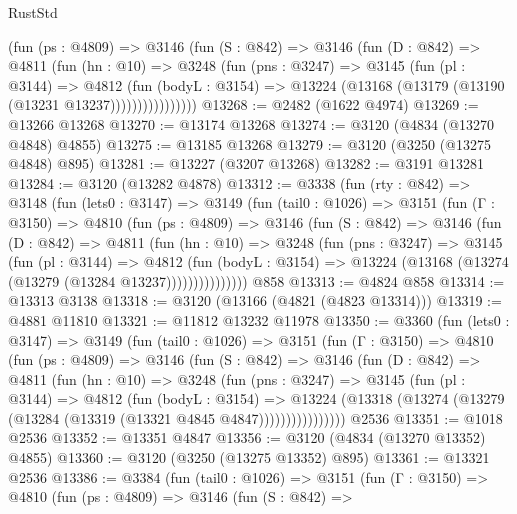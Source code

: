 \begin{lexlean}{RustStd}
\begin{coremodule}
              (fun (ps : @4809) =>
              @3146
                (fun (S : @842) =>
                @3146
                  (fun (D : @842) =>
                  @4811
                    (fun (hn : @10) =>
                    @3248
                      (fun (pns : @3247) =>
                      @3145
                        (fun (pl : @3144) =>
                        @4812
                          (fun (bodyL : @3154) =>
                          @13224 (@13168 (@13179 (@13190 (@13231 @13237))))))))))))))))
@13268 := @2482 (@1622 @4974)
@13269 := @13266 @13268
@13270 := @13174 @13268
@13274 := @3120 (@4834 (@13270 @4848) @4855)
@13275 := @13185 @13268
@13279 := @3120 (@3250 (@13275 @4848) @895)
@13281 := @13227 (@3207 @13268)
@13282 := @3191 @13281
@13284 := @3120 (@13282 @4878)
@13312 := @3338
    (fun (rty : @842) =>
    @3148
      (fun (lets0 : @3147) =>
      @3149
        (fun (tail0 : @1026) =>
        @3151
          (fun (Γ : @3150) =>
          @4810
            (fun (ps : @4809) =>
            @3146
              (fun (S : @842) =>
              @3146
                (fun (D : @842) =>
                @4811
                  (fun (hn : @10) =>
                  @3248
                    (fun (pns : @3247) =>
                    @3145
                      (fun (pl : @3144) =>
                      @4812
                        (fun (bodyL : @3154) =>
                        @13224 (@13168 (@13274 (@13279 (@13284 @13237)))))))))))))))
    @858
@13313 := @4824 @858
@13314 := @13313 @3138
@13318 := @3120 (@13166 (@4821 (@4823 @13314)))
@13319 := @4881 @11810
@13321 := @11812 @13232 @11978
@13350 := @3360
    (fun (lets0 : @3147) =>
    @3149
      (fun (tail0 : @1026) =>
      @3151
        (fun (Γ : @3150) =>
        @4810
          (fun (ps : @4809) =>
          @3146
            (fun (S : @842) =>
            @3146
              (fun (D : @842) =>
              @4811
                (fun (hn : @10) =>
                @3248
                  (fun (pns : @3247) =>
                  @3145
                    (fun (pl : @3144) =>
                    @4812
                      (fun (bodyL : @3154) =>
                      @13224
                        (@13318 (@13274 (@13279 (@13284 (@13319 (@13321 @4845 @4847))))))))))))))))
    @2536
@13351 := @1018 @2536
@13352 := @13351 @4847
@13356 := @3120 (@4834 (@13270 @13352) @4855)
@13360 := @3120 (@3250 (@13275 @13352) @895)
@13361 := @13321 @2536
@13386 := @3384
    (fun (tail0 : @1026) =>
    @3151
      (fun (Γ : @3150) =>
      @4810
        (fun (ps : @4809) =>
        @3146
          (fun (S : @842) =>

\end{coremodule}
\end{lexlean}

